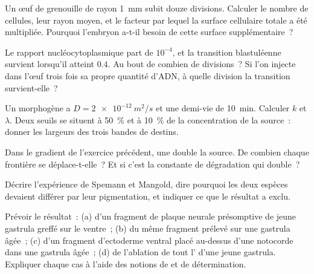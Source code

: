 \begin{exercise}[$\star\star$]\label{exo:b2:vertebrate-development:5}
Un œuf de grenouille de rayon \qty{1}{mm} subit douze divisions.
Calculer le nombre de cellules, leur rayon moyen, et le facteur par
lequel la surface cellulaire totale a été multipliée. Pourquoi l'embryon
a-t-il besoin de cette surface supplémentaire~?
\end{exercise}

\begin{exercise}[$\star\star$]\label{exo:b2:vertebrate-development:6}
Le rapport nucléocytoplasmique part de $10^{-4}$, et la transition
blastuléenne survient lorsqu'il atteint $0.4$. Au bout de combien de
divisions~? Si l'on injecte dans l'œuf trois fois sa propre quantité
d'ADN, à quelle division la transition survient-elle~?
\end{exercise}

\begin{exercise}[$\star\star$]\label{exo:b2:vertebrate-development:7}
Un morphogène a $D = \qty{2e-12}{m^2/s}$ et une demi-vie de
\qty{10}{min}. Calculer $k$ et $\lambda$. Deux seuils se situent à
\qty{50}{\%} et à \qty{10}{\%} de la concentration de la source~: donner
les largeurs des trois bandes de destins.
\end{exercise}

\begin{exercise}[$\star\star$]\label{exo:b2:vertebrate-development:8}
Dans le gradient de l'exercice précédent, une  double la
source. De combien chaque frontière se déplace-t-elle~? Et si c'est la
constante de dégradation qui double~?
\end{exercise}

\begin{exercise}[$\star\star$]\label{exo:b2:vertebrate-development:9}
Décrire l'expérience de Spemann et Mangold, dire pourquoi les deux
espèces devaient différer par leur pigmentation, et indiquer ce que le
résultat a exclu.
\end{exercise}

\begin{exercise}[$\star\star\star$]\label{exo:b2:vertebrate-development:10}
Prévoir le résultat~: (a) d'un fragment de plaque neurale présomptive de
jeune gastrula greffé sur le ventre~; (b) du même fragment prélevé sur
une gastrula âgée~; (c) d'un fragment d'ectoderme ventral placé
au-dessus d'une notocorde dans une gastrula âgée~; (d) de l'ablation de
tout l' d'une jeune gastrula. Expliquer chaque cas à l'aide
des notions de  et de détermination.
\end{exercise}

